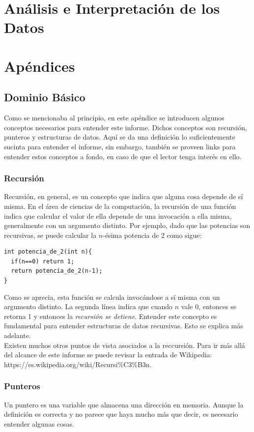 \documentclass[12pt,letterpaper]{report}
\begin{document}
\section{Análisis e Interpretación de los Datos}
\section{Apéndices}
\subsection{Dominio Básico}
\label{subsec:apen_dombasico}
Como se mencionaba al principio, en este apéndice se introducen algunos conceptos necesarios para entender este informe. Dichos conceptos son recursión, punteros y estructuras de datos. Aquí se da una definición lo suficientemente sucinta para entender el informe, sin embargo, también se proveen links para entender estos conceptos a fondo, en caso de que el lector tenga interés en ello.

\subsubsection{Recursión}

Recursión, en general, es un concepto que indica que alguna cosa depende de sí misma. En el área de ciencias de la computación, la recursión de una función indica que calcular el valor de ella depende de una invocación a ella misma, generalmente con un argumento distinto. Por ejemplo, dado que las potencias son recursivas, se puede calcular la $n$-ésima potencia de 2 como sigue:

\begin{verbatim}
int potencia_de_2(int n){
  if(n==0) return 1;
  return potencia_de_2(n-1);
}
\end{verbatim}

Como se aprecia, esta función se calcula invocándose a sí misma con un argumento distinto. La segunda línea indica que cuando $n$ vale 0, entonces se retorna 1 y entonces la \emph{recursión se detiene}. Entender este concepto es fundamental para entender estructuras de datos recursivas. Esto se explica más adelante.\\

Existen muchos otros puntos de vista asociados a la reccursión. Para ir más allá del alcance de este informe se puede revisar la entrada de Wikipedia: https://es.wikipedia.org/wiki/Recursi\%C3\%B3n.

\subsubsection{Punteros}
Un puntero es una variable que almacena una dirección en memoria. Aunque la definición es correcta y no parece que haya mucho más que decir, es necesario entender algunas cosas.\\
\end{document}
